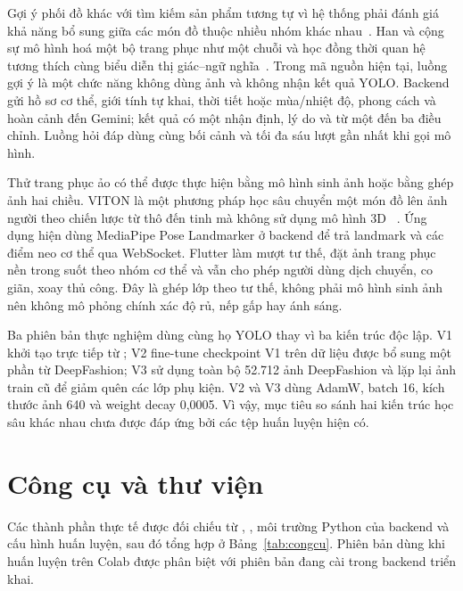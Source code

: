 Gợi ý phối đồ khác với tìm kiếm sản phẩm tương tự vì hệ thống phải đánh giá
khả năng bổ sung giữa các món đồ thuộc nhiều nhóm khác nhau~\cite{McAuley2015}. Han và cộng sự
mô hình hoá một bộ trang phục như một chuỗi và học đồng thời quan hệ tương
thích cùng biểu diễn thị giác--ngữ nghĩa~\cite{Han2017}. Trong mã nguồn hiện
tại, luồng gợi ý là một chức năng không dùng ảnh và không nhận kết quả YOLO.
Backend gửi hồ sơ cơ thể, giới tính tự khai, thời tiết hoặc mùa/nhiệt độ,
phong cách và hoàn cảnh đến Gemini; kết quả có một nhận định, lý do và từ một
đến ba điều chỉnh. Luồng hỏi đáp dùng cùng bối cảnh và tối đa sáu lượt gần
nhất khi gọi mô hình.

Thử trang phục ảo có thể được thực hiện bằng mô hình sinh ảnh hoặc bằng ghép
ảnh hai chiều. VITON là một phương pháp học sâu chuyển một món đồ lên ảnh
người theo chiến lược từ thô đến tinh mà không sử dụng mô hình 3D
~\cite{VITON2018}. Ứng dụng hiện dùng MediaPipe Pose Landmarker ở backend để
trả landmark và các điểm neo cơ thể qua WebSocket. Flutter làm mượt tư thế,
đặt ảnh trang phục nền trong suốt theo nhóm cơ thể và vẫn cho phép người dùng
dịch chuyển, co giãn, xoay thủ công. Đây là ghép lớp theo tư thế, không phải
mô hình sinh ảnh nên không mô phỏng chính xác độ rủ, nếp gấp hay ánh sáng.

Ba phiên bản thực nghiệm dùng cùng họ YOLO thay vì ba kiến trúc độc lập. V1
khởi tạo trực tiếp từ ; V2 fine-tune checkpoint V1 trên dữ
liệu được bổ sung một phần từ DeepFashion; V3 sử dụng toàn bộ 52.712 ảnh
DeepFashion và lặp lại ảnh train cũ để giảm quên các lớp phụ kiện. V2 và V3
dùng AdamW, batch 16, kích thước ảnh 640 và weight decay 0,0005. Vì vậy, mục
tiêu so sánh hai kiến trúc học sâu khác nhau chưa được đáp ứng bởi các tệp
huấn luyện hiện có.

\section{Công cụ và thư viện}

Các thành phần thực tế được đối chiếu từ ,
, môi trường Python của backend và cấu hình huấn luyện,
sau đó tổng hợp ở Bảng~\ref{tab:congcu}. Phiên bản dùng khi huấn luyện trên
Colab được phân biệt với phiên bản đang cài trong backend triển khai.


